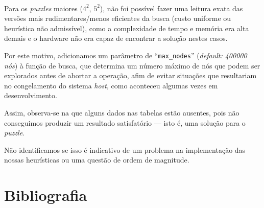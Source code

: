 \documentclass[12pt]{article}
\begin{document}
\paragraph{}
Para os \textit{puzzles} maiores ($4^2$, $5^2$), não foi possível fazer uma leitura exata das versões mais
rudimentares/menos eficientes da busca (custo uniforme ou heurística não admissível), como a complexidade de tempo e
memória era alta demais e o hardware não era capaz de encontrar a solução nestes casos. 

Por este motivo, adicionamos um
parâmetro de ``\texttt{max\_nodes}'' (\textit{default: 400000 nós}) à função de busca, que determina um número máximo de nós que podem ser explorados
antes de abortar a operação, afim de evitar situações que resultariam no congelamento do sistema \textit{host}, como
aconteceu algumas vezes em desenvolvimento.

Assim, observa-se na  que alguns dados nas tabelas estão ausentes, pois não conseguimos produzir um
resultado satisfatório --- isto é, uma solução para o \textit{puzzle}.

Não identificamos se isso é indicativo de um problema na implementação das nossas heurísticas ou uma questão de ordem de
magnitude.

\newpage
\section{Bibliografia}


\end{document}
